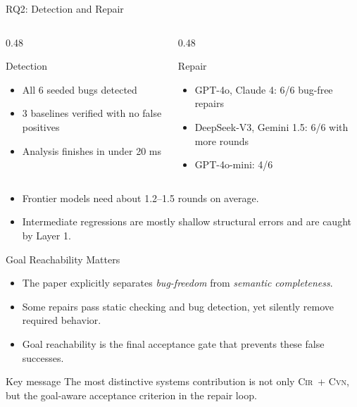 \documentclass[aspectratio=169]{beamer}
\newcommand{\Cir}{\textsc{Cir}}
\newcommand{\Cvn}{\textsc{Cvn}}
\begin{document}
\begin{frame}{RQ2: Detection and Repair}
  \begin{columns}[T]
    \begin{column}{0.48\textwidth}
      \begin{block}{Detection}
        \begin{itemize}
          \item All 6 seeded bugs detected
          \item 3 baselines verified with no false positives
          \item Analysis finishes in under 20 ms
        \end{itemize}
      \end{block}
    \end{column}
    \begin{column}{0.48\textwidth}
      \begin{block}{Repair}
        \begin{itemize}
          \item GPT-4o, Claude 4: 6/6 bug-free repairs
          \item DeepSeek-V3, Gemini 1.5: 6/6 with more rounds
          \item GPT-4o-mini: 4/6
        \end{itemize}
      \end{block}
    \end{column}
  \end{columns}
  \vspace{0.4em}
  \begin{itemize}
    \item Frontier models need about 1.2--1.5 rounds on average.
    \item Intermediate regressions are mostly shallow structural errors and are caught by Layer 1.
  \end{itemize}
\end{frame}

\begin{frame}{Goal Reachability Matters}
  \begin{itemize}
    \item The paper explicitly separates \emph{bug-freedom} from \emph{semantic completeness}.
    \item Some repairs pass static checking and bug detection, yet silently remove required behavior.
    \item Goal reachability is the final acceptance gate that prevents these false successes.
  \end{itemize}
  \begin{block}{Key message}
    The most distinctive systems contribution is not only \Cir\ + \Cvn, but the goal-aware acceptance criterion in the repair loop.
  \end{block}
\end{frame}
\end{document}
